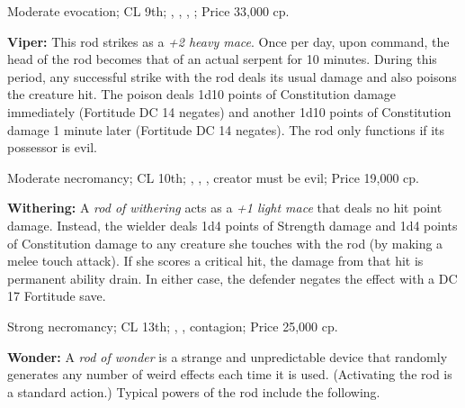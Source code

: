 Moderate evocation; CL 9th; , , , ; Price 33,000 cp.

\textbf{Viper:} This rod strikes as a \emph{+2 heavy mace}. Once per day, upon command, the head of the rod becomes that of an actual serpent for 10 minutes. During this period, any successful strike with the rod deals its usual damage and also poisons the creature hit. The poison deals 1d10 points of Constitution damage immediately (Fortitude DC 14 negates) and another 1d10 points of Constitution damage 1 minute later (Fortitude DC 14 negates). The rod only functions if its possessor is evil.

Moderate necromancy; CL 10th; , , , creator must be evil; Price 19,000 cp.

\textbf{Withering:} A \emph{rod of withering} acts as a \emph{+1 light mace} that deals no hit point damage. Instead, the wielder deals 1d4 points of Strength damage and 1d4 points of Constitution damage to any creature she touches with the rod (by making a melee touch attack). If she scores a critical hit, the damage from that hit is permanent ability drain. In either case, the defender negates the effect with a DC 17 Fortitude save.

Strong necromancy; CL 13th; , , contagion; Price 25,000 cp.

\textbf{Wonder:} A \emph{rod of wonder} is a strange and unpredictable device that randomly generates any number of weird effects each time it is used. (Activating the rod is a standard action.) Typical powers of the rod include the following.


